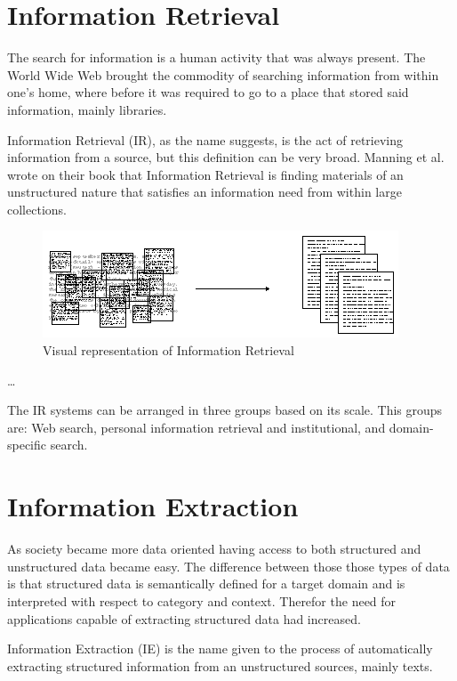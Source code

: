 \section{Information Retrieval}

The search for information is a human activity that was always present.
The World Wide Web brought the commodity of searching information from within one's home, where before it was required to go to a place that stored said information, mainly libraries.

Information Retrieval (IR), as the name suggests, is the act of retrieving information from a source, but this definition can be very broad.
Manning et al.\cite{manning2008introduction} wrote on their book that Information Retrieval is finding materials of an unstructured nature that satisfies an information need from within large collections.

\begin{figure}[H]
\centering
\includegraphics[scale=0.65]{ch2/assets/retrieve.png}
    \caption[InformationRetrival]{Visual representation of Information Retrieval\cite{gate2019}}
\label{fig:iret}
\end{figure}

\dots %

The IR systems can be arranged in three groups based on its scale.
This groups are: Web search, personal information retrieval and institutional, and domain-specific search.

\section{Information Extraction}

As society became more data oriented having access to both structured and unstructured data became easy.
The difference between those those types of data is that structured data is semantically defined for a target domain and is interpreted with respect to category and context.
Therefor the need for applications capable of extracting structured data had increased.

Information Extraction (IE) is the name given to the process of automatically extracting structured information from an unstructured sources, mainly texts.

